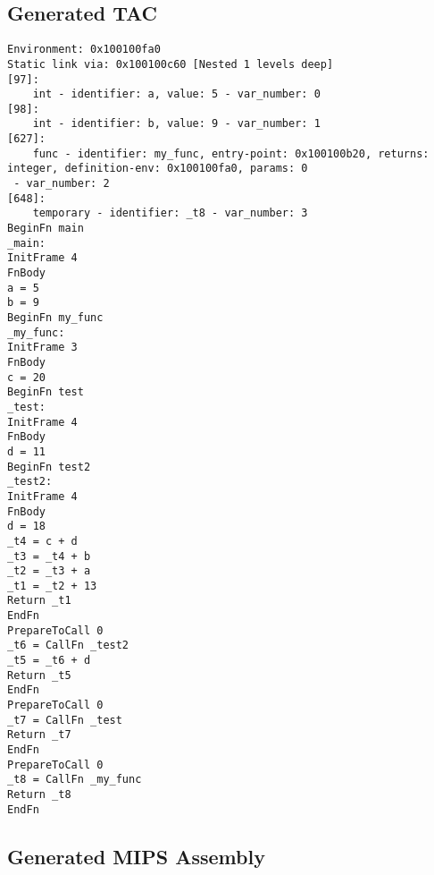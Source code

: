 \subsection{Generated TAC}
\begin{verbatim}
Environment: 0x100100fa0
Static link via: 0x100100c60 [Nested 1 levels deep]
[97]:
	int - identifier: a, value: 5 - var_number: 0
[98]:
	int - identifier: b, value: 9 - var_number: 1
[627]:
	func - identifier: my_func, entry-point: 0x100100b20, returns: integer, definition-env: 0x100100fa0, params: 0
 - var_number: 2
[648]:
	temporary - identifier: _t8 - var_number: 3
BeginFn main
_main:
InitFrame 4
FnBody
a = 5
b = 9
BeginFn my_func
_my_func:
InitFrame 3
FnBody
c = 20
BeginFn test
_test:
InitFrame 4
FnBody
d = 11
BeginFn test2
_test2:
InitFrame 4
FnBody
d = 18
_t4 = c + d
_t3 = _t4 + b
_t2 = _t3 + a
_t1 = _t2 + 13
Return _t1
EndFn
PrepareToCall 0
_t6 = CallFn _test2
_t5 = _t6 + d
Return _t5
EndFn
PrepareToCall 0
_t7 = CallFn _test
Return _t7
EndFn
PrepareToCall 0
_t8 = CallFn _my_func
Return _t8
EndFn
\end{verbatim}\subsection{Generated MIPS Assembly}
